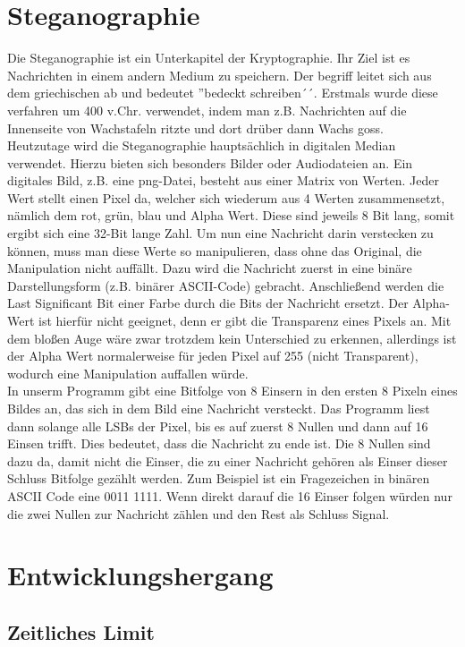 \documentclass[11pt]{article}
\begin{document}
\newpage
\section{Steganographie}
Die Steganographie ist ein Unterkapitel der Kryptographie. Ihr Ziel ist es Nachrichten in einem andern Medium zu speichern. Der begriff leitet sich aus dem griechischen ab und bedeutet ''bedeckt schreiben´´. Erstmals wurde diese verfahren um 400 v.Chr. verwendet, indem man z.B. Nachrichten auf die Innenseite von Wachstafeln ritzte und dort drüber dann Wachs goss.\\
Heutzutage wird die Steganographie hauptsächlich in digitalen Median verwendet. Hierzu bieten sich besonders Bilder oder Audiodateien an. Ein digitales Bild, z.B. eine png-Datei, besteht aus einer Matrix von Werten. Jeder Wert stellt einen Pixel da, welcher sich wiederum aus 4 Werten zusammensetzt, nämlich dem rot, grün, blau und Alpha Wert. Diese sind jeweils 8 Bit lang, somit ergibt sich eine 32-Bit lange Zahl. Um nun eine Nachricht darin verstecken zu können, muss man diese Werte so manipulieren, dass ohne das Original, die Manipulation nicht auffällt. Dazu wird die Nachricht zuerst in eine binäre Darstellungsform (z.B. binärer ASCII-Code) gebracht. Anschließend werden die Last Significant Bit einer Farbe durch die Bits der Nachricht ersetzt. Der Alpha-Wert ist hierfür nicht geeignet, denn er gibt die Transparenz eines Pixels an. Mit dem bloßen Auge wäre zwar trotzdem kein Unterschied zu erkennen, allerdings ist der Alpha Wert normalerweise für jeden Pixel auf 255 (nicht Transparent), wodurch eine Manipulation auffallen würde.\\
In unserm Programm gibt eine Bitfolge von 8 Einsern in den ersten 8 Pixeln eines Bildes an, das sich in dem Bild eine Nachricht versteckt. Das Programm liest dann solange alle LSBs der Pixel, bis es auf zuerst 8 Nullen und dann auf 16 Einsen trifft. Dies bedeutet, dass die Nachricht zu ende ist. Die 8 Nullen sind dazu da, damit nicht die Einser, die zu einer Nachricht gehören als Einser dieser Schluss Bitfolge gezählt werden. Zum Beispiel ist ein Fragezeichen in binären ASCII Code eine 0011 1111. Wenn direkt darauf die 16 Einser folgen würden nur die zwei Nullen zur Nachricht zählen und den Rest als Schluss Signal.


\newpage
\section{Entwicklungshergang}

\subsection{Zeitliches Limit}
\end{document}
